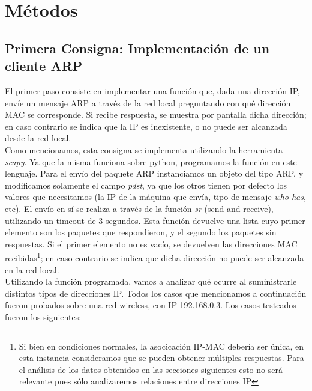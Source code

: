 \section{M\'etodos}


\subsection{Primera Consigna: Implementaci\'on de un cliente ARP}\label{sec:metodos_1}
El primer paso consiste en implementar una funci\'on que, dada una direcci\'on IP, env\'ie un mensaje ARP a trav\'es de la red local preguntando con qu\'e direcci\'on MAC se corresponde. Si recibe respuesta, se muestra por pantalla dicha direcci\'on; en caso contrario se indica que la IP es inexistente, o no puede ser alcanzada desde la red local.\\

Como mencionamos, esta consigna se implementa utilizando la herramienta \emph{scapy}. Ya que la misma funciona sobre python, programamos la funci\'on en este lenguaje. Para el env\'io del paquete ARP instanciamos un objeto del tipo ARP, y modificamos solamente el campo \emph{pdst}, ya que los otros tienen por defecto los valores que necesitamos (la IP de la m\'aquina que env\'ia, tipo de mensaje \emph{who-has}, etc). El env\'io en s\'i se realiza a trav\'es de la funci\'on \emph{sr} (send and receive), utilizando un timeout de 3 segundos. Esta funci\'on devuelve una lista cuyo primer elemento son los paquetes que respondieron, y el segundo los paquetes sin respuestas. Si el primer elemento no es vac\'io, se devuelven las direcciones MAC  recibidas\footnote{Si bien en condiciones normales, la asocicación IP-MAC debería ser única, en esta instancia consideramos que se pueden obtener múltiples respuestas. Para el análisis de los datos obtenidos en las secciones siguientes esto no será relevante pues sólo 
analizaremos relaciones entre direcciones IP}; en caso contrario se indica que dicha direcci\'on no puede ser alcanzada en la red local. \\

Utilizando la funci\'on programada, vamos a analizar qu\'e ocurre al suministrarle distintos tipos de direcciones IP. Todos los casos que mencionamos a continuaci\'on fueron probados sobre una red wireless, con IP 192.168.0.3. Los casos testeados fueron los siguientes:

